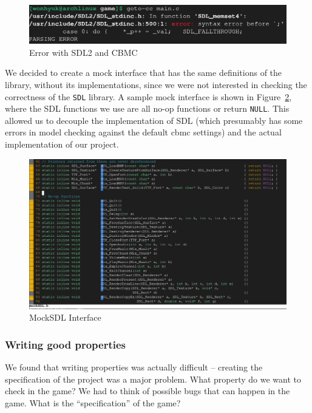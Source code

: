 \documentclass{article}
\begin{document}
\begin{figure}[h!]
    \includegraphics[width=\linewidth]{cbmc-sdl.png}
    \caption{Error with SDL2 and CBMC}
    \label{fig:cbmc-sdl}
\end{figure}

We decided to create a mock interface that has the same definitions of the library, without its implementations,
since we were not interested in checking the correctness of the \texttt{SDL} library.
A sample mock interface is shown in Figure~\ref{fig:mock-sdl}, where the SDL functions we use are all no-op functions or return \texttt{NULL}.
This allowed us to decouple the implementation of SDL (which presumably has some errors in model checking against the default cbmc settings) and the actual implementation of our project.

\begin{figure}[h!]
    \includegraphics[width=\linewidth]{mock-sdl.png}
    \caption{MockSDL Interface}
    \label{fig:mock-sdl}
\end{figure}

\subsubsection{Writing good properties}
We found that writing properties was actually difficult -- creating the specification of the project was a major problem.
What property do we want to check in the game?
We had to think of possible bugs that can happen in the game.
What is the ``specification'' of the game?
\end{document}
